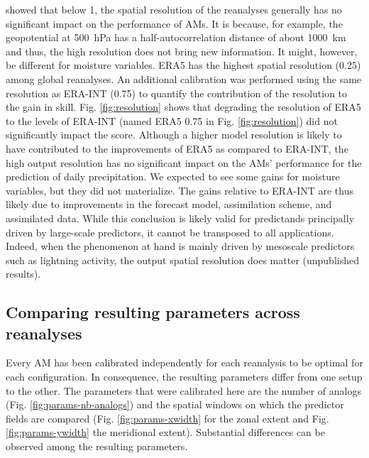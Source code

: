 \documentclass[alpha-refs]{wiley-article}
\begin{document}
\citet{Horton2018b} showed that below 1\degree, the spatial resolution of the reanalyses generally has no significant impact on the performance of AMs. It is because, for example, the geopotential at 500~hPa has a half-autocorrelation distance of about 1000~km \citep{Thiebaux1985} and thus, the high resolution does not bring new information. It might, however, be different for moisture variables. ERA5 has the highest spatial resolution (0.25\degree) among global reanalyses. An additional calibration was performed using the same resolution as ERA-INT (0.75\degree) to quantify the contribution of the resolution to the gain in skill. Fig. \ref{fig:resolution} shows that degrading the resolution of ERA5 to the levels of ERA-INT (named ERA5 0.75 in Fig. \ref{fig:resolution}) did not significantly impact the score. Although a higher model resolution is likely to have contributed to the improvements of ERA5 as compared to ERA-INT, the high output resolution has no significant impact on the AMs’ performance for the prediction of daily precipitation. We expected to see some gains for moisture variables, but they did not materialize. The gains relative to ERA-INT are thus likely due to improvements in the forecast model, assimilation scheme, and assimilated data. While this conclusion is likely valid for predictands principally driven by large-scale predictors, it cannot be transposed to all applications. Indeed, when the phenomenon at hand is mainly driven by mesoscale predictors such as lightning activity, the output spatial resolution does matter (unpublished results).


\subsection{Comparing resulting parameters across reanalyses}
\label{sec:results_parameters}

Every AM has been calibrated independently for each reanalysis to be optimal for each configuration. In consequence, the resulting parameters differ from one setup to the other. The parameters that were calibrated here are the number of analogs (Fig. \ref{fig:params-nb-analogs}) and the spatial windows on which the predictor fields are compared (Fig. \ref{fig:params-xwidth} for the zonal extent and Fig. \ref{fig:params-ywidth} the meridional extent). Substantial differences can be observed among the resulting parameters.
\end{document}

